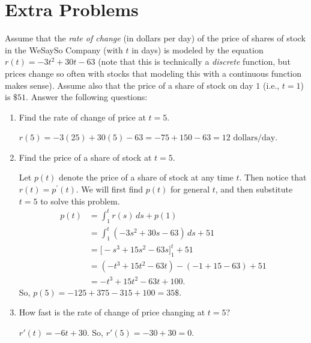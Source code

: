 \documentclass[nooutcomes, handout]{ximera}
\renewcommand{\d}{\,d}
\newcommand{\eval}[1]{\bigg[ #1 \bigg]}
\begin{document}
	

	







\section{Extra Problems}

\begin{problem}
Assume that the {\it rate of change} (in dollars per day) of the price of shares of stock 
in the WeSaySo Company (with $t$ in days) is modeled by the equation $r(t) = -3t^2+30t-63$ 
(note that this is technically a {\it discrete} function, but prices change so often with stocks that modeling this with a continuous function makes sense).  
Assume also that the price of a share of stock on day $1$ (i.e., $t=1$) is $\$51$.  
Answer the following questions:
	\begin{enumerate}
	
	\item  Find the rate of change of price at $t=5$.  
		\begin{freeResponse}
		$r(5) = -3(25) + 30(5) - 63 = -75+150-63=12 \text{ dollars/day}$.  
		\end{freeResponse}
		
		
		
	
	\item  Find the price of a share of stock at $t=5$.  
		\begin{freeResponse}
		Let $p(t)$ denote the price of a share of stock at any time $t$.  
		Then notice that $r(t) = p^\prime (t)$.  
		We will first find $p(t)$ for general $t$, and then substitute $t=5$ to solve this problem.
			\begin{align*}
			p(t) &= \int_1^t r(s) \d s + p(1)  \\
			&= \int_1^t \left( -3s^2 + 30s - 63 \right) \d s + 51  \\
			&= \eval{ - s^3 + 15s^2 - 63s}_1^t + 51  \\
			&= \left( - t^3 + 15t^2 - 63t \right) - (-1+15-63) + 51  \\
			&= -t^3 + 15t^2 - 63t + 100.
			\end{align*}
		So, $p(5) = -125+375-315+100=35\$.$
		\end{freeResponse}
		
		
		
	
	\item  How fast is the rate of change of price changing at $t=5$?  
		\begin{freeResponse}
		$r'(t) = -6t + 30$.  So, $r'(5) = -30+30=0$.  
		\end{freeResponse}
		

\end{enumerate}
\end{problem}
\end{document}
